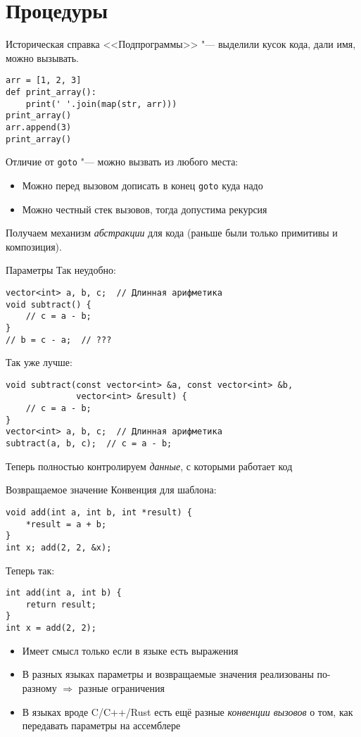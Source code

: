\section{Процедуры}
\begin{frame}[t,fragile]{Историческая справка}
	<<Подпрограммы>> "--- выделили кусок кода, дали имя, можно вызывать.
\begin{verbatim}
arr = [1, 2, 3]
def print_array():
    print(' '.join(map(str, arr)))
print_array()
arr.append(3)
print_array()
\end{verbatim}
	Отличие от \verb`goto` "--- можно вызвать из любого места:
	\begin{itemize}
	\item Можно перед вызовом дописать в конец \verb`goto` куда надо
	\item Можно честный стек вызовов, тогда допустима рекурсия
	\end{itemize}
	
	Получаем механизм \textit{абстракции} для кода
	(раньше были только примитивы и композиция).
\end{frame}

\begin{frame}[t,fragile]{Параметры}
	Так неудобно:
\begin{verbatim}
vector<int> a, b, c;  // Длинная арифметика
void subtract() {
	// c = a - b;
}
// b = c - a;  // ???
\end{verbatim}

	Так уже лучше:
\begin{verbatim}
void subtract(const vector<int> &a, const vector<int> &b,
              vector<int> &result) {
	// c = a - b;
}
vector<int> a, b, c;  // Длинная арифметика
subtract(a, b, c);  // c = a - b;
\end{verbatim}
	Теперь полностью контролируем \textit{данные}, с которыми работает код
\end{frame}

\begin{frame}[t,fragile]{Возвращаемое значение}
	Конвенция для шаблона:
\begin{verbatim}
void add(int a, int b, int *result) {
    *result = a + b;
}
int x; add(2, 2, &x);
\end{verbatim}
	Теперь так:
\begin{verbatim}
int add(int a, int b) {
    return result;
}
int x = add(2, 2);
\end{verbatim}
	\begin{itemize}
	\item	Имеет смысл только если в языке есть выражения
	\item
		В разных языках параметры и возвращаемые значения
		реализованы по-разному $\Rightarrow$ разные ограничения
	\item
		В языках вроде C/C++/Rust есть ещё разные \textit{конвенции вызовов}
		о том, как передавать параметры на ассемблере
	\end{itemize}
\end{frame}

